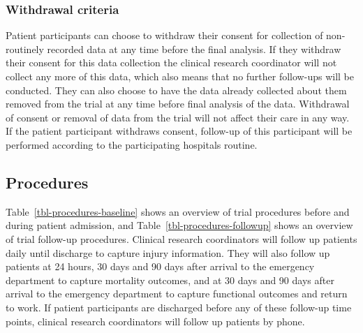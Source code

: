\documentclass[
]{scrartcl}
\begin{document}
\hypertarget{withdrawal-criteria}{%
\subsubsection{Withdrawal criteria}\label{withdrawal-criteria}}

Patient participants can choose to withdraw their consent for collection
of non-routinely recorded data at any time before the final analysis. If
they withdraw their consent for this data collection the clinical
research coordinator will not collect any more of this data, which also
means that no further follow-ups will be conducted. They can also choose
to have the data already collected about them removed from the trial at
any time before final analysis of the data. Withdrawal of consent or
removal of data from the trial will not affect their care in any way. If
the patient participant withdraws consent, follow-up of this participant
will be performed according to the participating hospitals routine.

\hypertarget{procedures}{%
\subsection{Procedures}\label{procedures}}

Table~\ref{tbl-procedures-baseline} shows an overview of trial
procedures before and during patient admission, and
Table~\ref{tbl-procedures-followup} shows an overview of trial follow-up
procedures. Clinical research coordinators will follow up patients daily
until discharge to capture injury information. They will also follow up
patients at 24 hours, 30 days and 90 days after arrival to the emergency
department to capture mortality outcomes, and at 30 days and 90 days
after arrival to the emergency department to capture functional outcomes
and return to work. If patient participants are discharged before any of
these follow-up time points, clinical research coordinators will follow
up patients by phone.

\begingroup
\fontsize{10pt}{11pt}\selectfont
\addtolength{\tabcolsep}{-3pt}
\end{document}
